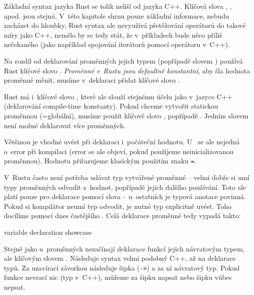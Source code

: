 \documentclass[main.tex]{subfiles}
\begin{document}

Základní syntax jazyka Rust se tolik neliší od jazyka C++. Klíčová slova ,
,  apod. jsou stejná. V~této kapitole shrnu pouze základní
informace, nebudu zacházet do hloubky. Rust syntax ale nevyužívá přetěžování operátorů
do takové míry jako C++, nemělo by se tedy stát, že v~příkladech bude něco příliš
nečekaného (jako například spojování iterátorů pomocí operátoru \icpp{|} v~C++).


Na rozdíl od deklarování proměnných jejich typem (popřípadě slovem ) používá
Rust klíčové slovo . \emph{Proměnné v~Rustu jsou defaultně konstantní}, aby
šla hodnota proměnné měnit, musíme v~deklaraci přidat klíčové slovo .

Rust má i~klíčové slovo , které ale slouží stejnému účelu jako
 v~jazyce C++ (deklarování compile-time konstanty).
Pokud chceme vytvořit statickou proměnnou (=globální), musíme použít klíčové slovo
, popřípadě . Jedním slovem není možné deklarovat více
proměnných.

Většinou je vhodné uvést při deklaraci i~počáteční hodnotu. U~ se ale
nejedná o~error při kompilaci (error se ale objeví, pokud použíjeme neinicializovanou
proměnnou). Hodnotu přiřazujeme klasickým použitím znaku \texttt{=}.

V~Rustu často není potřeba udávat typ vytvářené proměnné -- velmi dobře si umí typy
proměnných odvodit z~hodnot, popřípadě jejich dalšího používání. Toto ale platí pouze
pro deklarace pomocí slova  -- u~ostatních je typová anotace povinná. Pokud
si kompilátor neumí typ odvodit, je nutné typ explicitně uvést. Toho docílíme pomocí
dnes častějšího . Celá deklarace proměnné tedy vypadá takto:

\obrazek
{}
{variable declaration showcase}


Stejně jako u~proměnných nezačínají deklarace funkcí jejich návratovým typem, ale
klíčovým slovem . Následuje syntax velmi podobný C++, až na  deklarace typů. Za uzavírací závorkou následuje šipka (\texttt{->}) a za ní
návratový typ. Pokud funkce nevrací nic (typ  v~C++), můžeme za šipku napsat
 \irust{()} nebo šipku vůbec nepsat.
\end{document}
